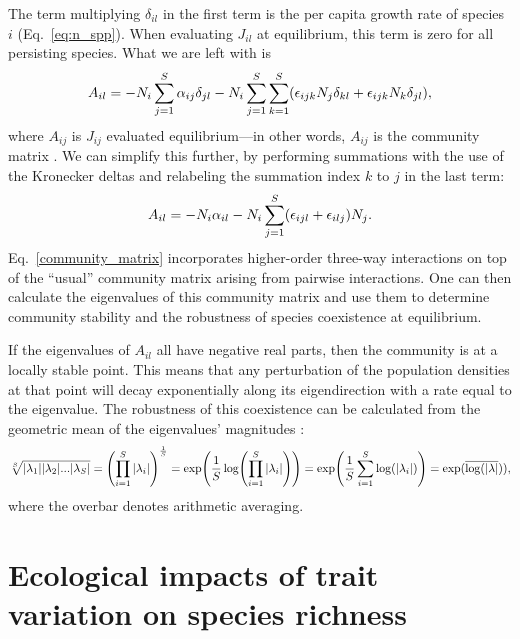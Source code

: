 \documentclass[10pt]{article}
\let\originalleft\left
\let\originalright\right
\renewcommand{\left}{\mathopen{}\mathclose\bgroup\originalleft}
\renewcommand{\right}{\aftergroup\egroup\originalright}
\begin{document}
The term multiplying $\delta_{il}$ in the first term is the per capita growth rate of species $i$ (Eq.~\ref{eq:n_spp}). When evaluating $J_{il}$ at equilibrium, this term is zero for all persisting species. What we are left with is
\begin{equation}
  \label{community_matrix_simpler}
   A_{il} = - N_{i} \sum_{j=1}^S \alpha_{ij} \delta_{jl}
   - N_{i} \sum_{j=1}^S \sum_{k=1}^{S} \left( \epsilon_{ijk} N_j \delta_{kl} + \epsilon_{ijk} N_k \delta_{jl} \right),
\end{equation}
where $A_{ij}$ is $J_{ij}$ evaluated equilibrium---in other words, $A_{ij}$ is the community matrix \citep{may_qualitative_1973}. We can simplify this further, by performing summations with the use of the Kronecker deltas and relabeling the summation index $k$ to $j$ in the last term:
\begin{equation}
  \label{community_matrix}
   A_{il} = - N_{i}\alpha_{il}- N_{i} \sum_{j=1}^{S} \left( \epsilon_{ijl} + \epsilon_{ilj} \right) N_j .
\end{equation}
Eq.~\ref{community_matrix} incorporates higher-order three-way interactions on top of the ``usual'' community matrix arising from pairwise interactions. One can then calculate the eigenvalues of this community matrix and use them to determine community stability and the robustness of species coexistence at equilibrium.

If the eigenvalues of $A_{il}$ all have negative real parts, then the community is at a locally stable point. This means that any perturbation of the population densities at that point will decay exponentially along its eigendirection with a rate equal to the eigenvalue. The robustness of this coexistence can be calculated from the geometric mean of the eigenvalues' magnitudes \citep{barabas_effect_2016-3}:
\begin{equation}
  \sqrt[S]{ |\lambda_{1}||\lambda_{2}|...|\lambda_{S}|} = \left( \prod_{i=1}^{S} |\lambda_{i}| \right)^\frac{1}{S} = \exp\left(\frac{1}{S}\log\left(\prod_{i=1}^{S} |\lambda_{i}|\right)\right) = \exp \left(\frac{1}{S} \sum_{i=1}^S \log(|\lambda_i|) \right) = \exp(\overline{\log(|\lambda|})) ,
\end{equation}
where the overbar denotes arithmetic averaging.


\newpage

\section{Ecological impacts of trait variation on species richness}
\end{document}
